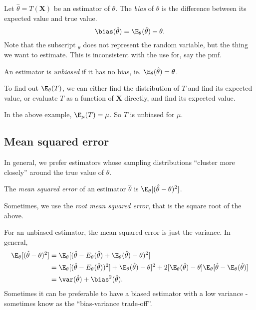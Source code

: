 \documentclass[a4paper]{article}
\begin{document}
\begin{defi}[Bias]
  Let $\hat{\theta} = T(\mathbf{X})$ be an estimator of $\theta$. The \emph{bias} of $\hat{\theta}$ is the difference between its expected value and true value.
  \[
    \bias(\hat{\theta}) = \E_\theta(\hat{\theta}) - \theta.
  \]
  Note that the subscript $_\theta$ does not represent the random variable, but the thing we want to estimate. This is inconsistent with the use for, say the pmf.

  An estimator is \emph{unbiased} if it has no bias, ie. $\E_\theta(\hat{\theta}) = \theta$.
\end{defi}
To find out $\E_\theta (T)$, we can either find the distribution of $T$ and find its expected value, or evaluate $T$ as a function of $\mathbf{X}$ directly, and find its expected value. 

\begin{eg}
  In the above example, $\E_\mu(T) =\mu$. So $T$ is unbiased for $\mu$. 
\end{eg}
\subsection{Mean squared error}
In general, we prefer estimators whose sampling distributions ``cluster more closely'' around the true value of $\theta$.
\begin{defi}
  The \emph{mean squared error} of an estimator $\hat{\theta}$ is $\E_\theta[(\hat{\theta} - \theta)^2]$.

  Sometimes, we use the \emph{root mean squared error}, that is the square root of the above.
\end{defi}
For an unbiased estimator, the mean squared error is just the variance. In general,
\begin{align*}
  \E_\theta[(\hat{\theta} - \theta)^2] &= \E_\theta[(\hat{\theta} - E_\theta(\hat{\theta}) + \E_\theta(\hat{\theta}) - \theta)^2]\\
  &= \E_\theta[(\hat{\theta} - E_\theta(\hat{\theta}))^2] + \E_\theta(\hat{\theta}) - \theta]^2 + 2[\E_\theta(\hat{\theta}) - \theta]\E_\theta[\hat{\theta} - \E_\theta(\hat{\theta})]\\
  &= \var(\hat{\theta}) + \bias^2(\hat{\theta}).
\end{align*}
Sometimes it can be preferable to have a biased estimator with a low variance - sometimes know as the ``bias-variance trade-off''.
\end{document}
